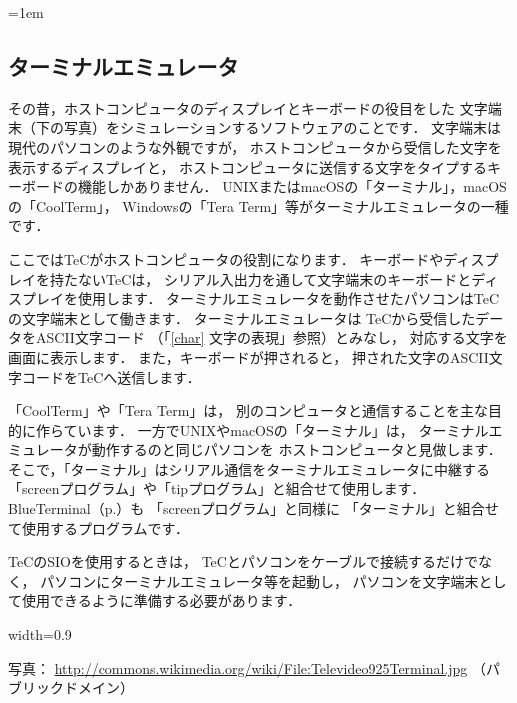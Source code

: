 \newpage
\begin{framed}{\parindent=1em
    \subsection*{ターミナルエミュレータ}\label{terminal}{\small
      その昔，ホストコンピュータのディスプレイとキーボードの役目をした
      文字端末（下の写真）をシミュレーションするソフトウェアのことです．
      文字端末は現代のパソコンのような外観ですが，
      ホストコンピュータから受信した文字を表示するディスプレイと，
      ホストコンピュータに送信する文字をタイプするキーボードの機能しかありません．
      UNIXまたはmacOSの「ターミナル」，macOSの「CoolTerm」，
      Windowsの「Tera Term」等がターミナルエミュレータの一種です．

      ここではTeCがホストコンピュータの役割になります．
      キーボードやディスプレイを持たないTeCは，
      シリアル入出力を通して文字端末のキーボードとディスプレイを使用します．
      ターミナルエミュレータを動作させたパソコンはTeCの文字端末として働きます．
      ターミナルエミュレータは
      TeCから受信したデータをASCII文字コード
      （「\ref{char} 文字の表現」参照）とみなし，
      対応する文字を画面に表示します．
      また，キーボードが押されると，
      押された文字のASCII文字コードをTeCへ送信します．

      「CoolTerm」や「Tera Term」は，
      別のコンピュータと通信することを主な目的に作らています．
      一方でUNIXやmacOSの「ターミナル」は，
      ターミナルエミュレータが動作するのと同じパソコンを
      ホストコンピュータと見做します．
      そこで，「ターミナル」はシリアル通信をターミナルエミュレータに中継する
      「screenプログラム」や「tipプログラム」と組合せて使用します．
      BlueTerminal（p.\pageref{BlueTerminal}）も
      「screenプログラム」と同様に
      「ターミナル」と組合せて使用するプログラムです．

      TeCのSIOを使用するときは，
      TeCとパソコンをケーブルで接続するだけでなく，
      パソコンにターミナルエミュレータ等を起動し，
      パソコンを文字端末として使用できるように準備する必要があります．
      \begin{center}
                          {width=0.9\columnwidth}
      \end{center}
      写真：
      \url{http://commons.wikimedia.org/wiki/File:Televideo925Terminal.jpg}
          （パブリックドメイン）
}}\end{framed}

